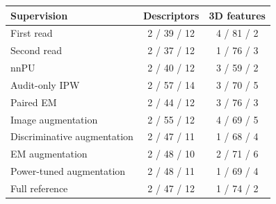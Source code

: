 \begin{tabular}{lcc}
\toprule
Supervision & Descriptors & 3D features \\
\midrule
First read & 2 / 39 / 12 & 4 / 81 / 2 \\
Second read & 2 / 37 / 12 & 1 / 76 / 3 \\
nnPU & 2 / 40 / 12 & 3 / 59 / 2 \\
Audit-only IPW & 2 / 57 / 14 & 3 / 70 / 5 \\
Paired EM & 2 / 44 / 12 & 3 / 76 / 3 \\
Image augmentation & 2 / 55 / 12 & 4 / 69 / 5 \\
Discriminative augmentation & 2 / 47 / 11 & 1 / 68 / 4 \\
EM augmentation & 2 / 48 / 10 & 2 / 71 / 6 \\
Power-tuned augmentation & 2 / 48 / 11 & 1 / 69 / 4 \\
Full reference & 2 / 47 / 12 & 1 / 74 / 2 \\
\bottomrule
\end{tabular}

